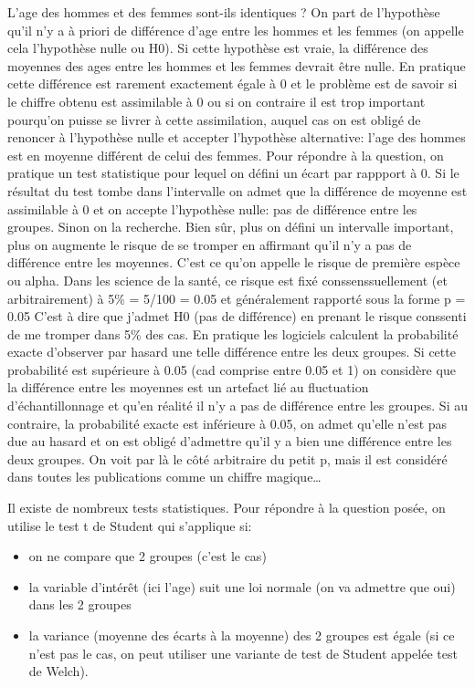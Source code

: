\documentclass[]{article}
\begin{document}
L'age des hommes et des femmes sont-ils identiques ? On part de
l'hypothèse qu'il n'y a à priori de différence d'age entre les hommes et
les femmes (on appelle cela l'hypothèse nulle ou H0). Si cette hypothèse
est vraie, la différence des moyennes des ages entre les hommes et les
femmes devrait être nulle. En pratique cette différence est rarement
exactement égale à 0 et le problème est de savoir si le chiffre obtenu
est assimilable à 0 ou si on contraire il est trop important pourqu'on
puisse se livrer à cette assimilation, auquel cas on est obligé de
renoncer à l'hypothèse nulle et accepter l'hypothèse alternative: l'age
des hommes est en moyenne différent de celui des femmes. Pour répondre à
la question, on pratique un test statistique pour lequel on défini un
écart par rappport à 0. Si le résultat du test tombe dans l'intervalle
on admet que la différence de moyenne est assimilable à 0 et on accepte
l'hypothèse nulle: pas de différence entre les groupes. Sinon on la
recherche. Bien sûr, plus on défini un intervalle important, plus on
augmente le risque de se tromper en affirmant qu'il n'y a pas de
différence entre les moyennes. C'est ce qu'on appelle le risque de
première espèce ou alpha. Dans les science de la santé, ce risque est
fixé conssenssuellement (et arbitrairement) à 5\% = 5/100 = 0.05 et
généralement rapporté sous la forme p = 0.05 C'est à dire que j'admet H0
(pas de différence) en prenant le risque conssenti de me tromper dans
5\% des cas. En pratique les logiciels calculent la probabilité exacte
d'observer par hasard une telle différence entre les deux groupes. Si
cette probabilité est supérieure à 0.05 (cad comprise entre 0.05 et 1)
on considère que la différence entre les moyennes est un artefact lié au
fluctuation d'échantillonnage et qu'en réalité il n'y a pas de
différence entre les groupes. Si au contraire, la probabilité exacte est
inférieure à 0.05, on admet qu'elle n'est pas due au hasard et on est
obligé d'admettre qu'il y a bien une différence entre les deux groupes.
On voit par là le côté arbitraire du petit p, mais il est considéré dans
toutes les publications comme un chiffre magique\ldots{}

Il existe de nombreux tests statistiques. Pour répondre à la question
posée, on utilise le test t de Student qui s'applique si:

\begin{itemize}
\itemsep1pt\parskip0pt
\item
  on ne compare que 2 groupes (c'est le cas)
\item
  la variable d'intérêt (ici l'age) suit une loi normale (on va admettre
  que oui) dans les 2 groupes
\item
  la variance (moyenne des écarts à la moyenne) des 2 groupes est égale
  (si ce n'est pas le cas, on peut utiliser une variante de test de
  Student appelée test de Welch).
\end{itemize}
\end{document}
